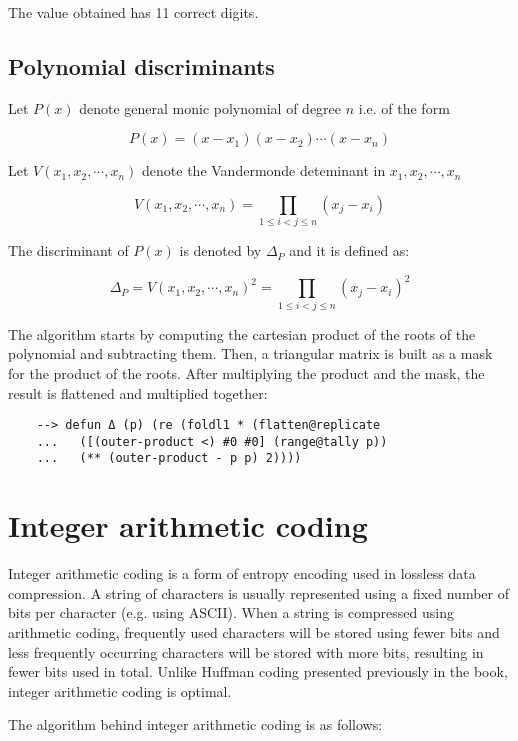 The value obtained has 11 correct digits.

\subsection{Polynomial discriminants}

Let $P(x)$ denote general monic polynomial of degree $n$ i.e. of the form

$$
P(x) = (x-x_1)(x-x_2) \cdots (x-x_n)
$$

Let $V(x_1,x_2, \cdots, x_n)$ denote the Vandermonde deteminant in $x_1,x_2, \cdots, x_n$

$$
V(x_1,x_2, \cdots , x_n) = \prod\limits_{1 \leq i < j \leq n} (x_j - x_i)
$$

The discriminant of $P(x)$ is denoted by $\Delta_P$ and it is defined as:

$$
\Delta_P = V(x_1,x_2, \cdots , x_n)^2 = \prod\limits_{1 \leq i < j \leq n} (x_j - x_i)^2
$$

The algorithm starts by computing the cartesian product of the roots of the polynomial and subtracting them. Then, a triangular matrix is built as a mask for the product of the roots. After multiplying the product and the mask, the result is flattened and multiplied together:

\begin{Verbatim}
    --> defun Δ (p) (re (foldl1 * (flatten@replicate
    ...   ([(outer-product <) #0 #0] (range@tally p))
    ...   (** (outer-product - p p) 2))))
\end{Verbatim}

\section{Integer arithmetic coding}

Integer arithmetic coding is a form of entropy encoding used in lossless data compression. A string of characters is usually represented using a fixed number of bits per character (e.g. using ASCII). When a string is compressed using arithmetic coding, frequently used characters will be stored using fewer bits and less frequently occurring characters will be stored with more bits, resulting in fewer bits used in total. Unlike Huffman coding presented previously in the book, integer arithmetic coding is optimal.

The algorithm behind integer arithmetic coding is as follows:

